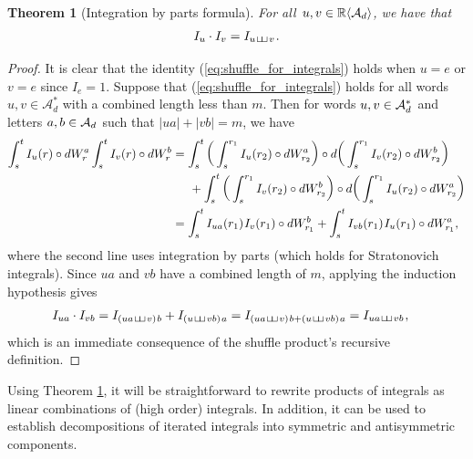\documentclass[sn-mathphys-num]{sn-jnl}%
\newtheorem{theorem}{Theorem}%
\newcommand{\R}{\mathbb{R}}
\newcommand{\m}{\hspace{0.25mm}}
\newcommand{\mm}{\hspace{5mm}}
\def\subshuffle{\hspace{0.25mm}\sqcup\hspace*{-0.55mm}\sqcup\hspace{0.25mm}}
\begin{document}
\begin{theorem}[Integration by parts formula]\label{thm:shuffle}
For all $\m u,v\in\R\langle\mathcal{A}_d\rangle$, we have that
\begin{align}\label{eq:shuffle_for_integrals}
I_{u}\cdot I_{v} = I_{u\subshuffle v}\m.
\end{align}
\end{theorem}
\begin{proof}
It is clear that the identity (\ref{eq:shuffle_for_integrals}) holds when $u=e$ or $v=e$ since $I_e=1$.
Suppose that (\ref{eq:shuffle_for_integrals}) holds for all words $u,v\in\mathcal{A}_d^\ast$ with a combined length less than $m$. Then for words $u,v\in\mathcal{A}_d^\ast\m$ and letters $a,b\in\mathcal{A}_d\m$ such that $|ua| + |vb| = m$, we have
\begin{align*}
\int_s^t I_u (r) \circ dW_r^{a}\int_s^t I_v(r)\circ dW_r^{b} & = \int_s^t\bigg(\int_s^{r_1} I_u(r_2)\circ dW_{r_2}^{a}\bigg)\circ d\bigg(\int_s^{r_1} I_v(r_2)\circ dW_{r_2}^{b}\bigg)\\
&\mm + \int_s^t\bigg(\int_s^{r_1} I_v(r_2)\circ dW_{r_2}^{b}\bigg)\circ d\bigg(\int_s^{r_1} I_u(r_2)\circ dW_{r_2}^{a}\bigg)\\
& = \int_s^t I_{ua}(r_1)\m I_v(r_1)\circ dW_{r_1}^{b} + \int_s^t I_{vb}(r_1)\m I_u(r_1)\circ dW_{r_1}^{a},
\end{align*}
where the second line uses integration by parts (which holds for Stratonovich integrals).
Since $ua$ and $vb$ have a combined length of $m$, applying the induction hypothesis gives
\begin{align*}
I_{ua}\cdot I_{vb} & = I_{(ua \subshuffle v)\m b} + I_{(u\subshuffle vb)\m a} = I_{(ua \subshuffle v)\m b + (u\subshuffle vb)\m a} = I_{ua\subshuffle vb}\m,
\end{align*}
which is an immediate consequence of the shuffle product's recursive definition.
\end{proof}

Using Theorem \ref{thm:shuffle}, it will be straightforward to rewrite products of integrals as linear combinations of (high order) integrals. In addition, it can be used to establish decompositions of iterated integrals into symmetric and antisymmetric components.\medbreak
\end{document}

